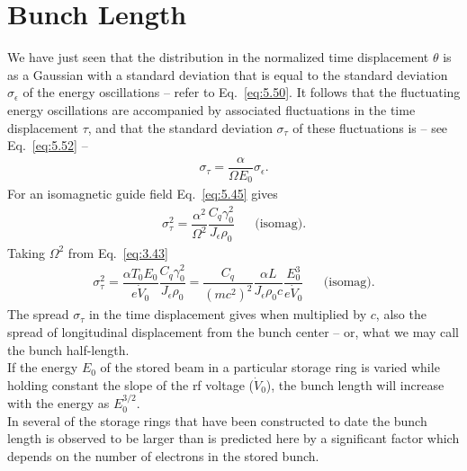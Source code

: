 \documentclass[../sands-adaptation.tex]{subfiles}
\begin{document}
\section{Bunch Length}\label{sec:5.4}

We have just seen that the distribution in the normalized time displacement $\theta$ is as a Gaussian with a standard deviation that is equal to the standard deviation $\sigma_\epsilon$ of the energy oscillations -- refer to Eq.~\eqref{eq:5.50}. It follows that the fluctuating energy oscillations are accompanied by associated fluctuations in the time displacement $\tau$, and that the standard deviation $\sigma_\tau$ of these fluctuations is -- see Eq.~\eqref{eq:5.52} --
\begin{align}
	\sigma_\tau = \dfrac{\alpha}{\Omega E_0} \sigma_\epsilon.
\end{align}
For an isomagnetic guide field Eq.~\eqref{eq:5.45} gives
\begin{align}
	\sigma_\tau^2 = \dfrac{\alpha^2}{\Omega^2} \dfrac{C_q \gamma_0^2}{J_\epsilon \rho_0} && \text{(isomag).}
\end{align}
Taking $\Omega^2$ from Eq.~\eqref{eq:3.43}
\begin{align}
	\sigma_\tau^2 = \dfrac{\alpha T_0 E_0}{e\dot{V}_0} \dfrac{C_q \gamma_0^2}{J_\epsilon \rho_0} = \dfrac{C_q}{(mc^2)^2} \dfrac{\alpha L}{J_\epsilon \rho_0 c} \dfrac{E_0^3}{e \dot{V}_0} && \text{(isomag).}
\end{align}
The spread $\sigma_\tau$ in the time displacement gives when multiplied by $c$, also the spread
of longitudinal displacement from the bunch center -- or, what we may call the bunch half-length.\\
If the energy $E_0$ of the stored beam in a particular storage ring is varied while holding constant the slope of the rf voltage ($\dot{V}_0$), the bunch length will increase with the energy as $E_0^{3/2}$.\\
In several of the storage rings that have been constructed to date the bunch length is observed to be larger than is predicted here by a significant factor which depends on the number of electrons
 in the stored bunch.
\end{document}

